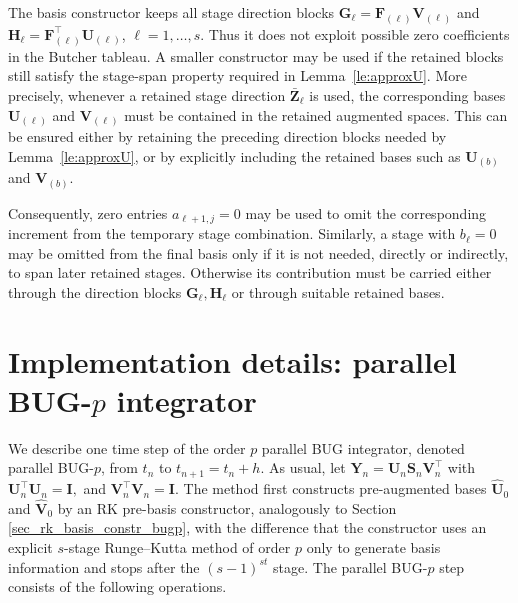 \documentclass[preprint,runningheads]{svjour3}
\newcommand\bfI{{\mathbf I}}
\newcommand\bfF{{\mathbf F}}
\newcommand\bfG{{\mathbf G}}
\newcommand\bfH{{\mathbf H}}
\newcommand\bfS{{\mathbf S}}
\newcommand\bfU{{\mathbf U}}
\newcommand\bfV{{\mathbf V}}
\newcommand\bfY{{\mathbf Y}}
\newcommand\bfZ{{\mathbf Z}}
\begin{document}
\begin{remark}
The basis constructor  keeps all stage direction
blocks $\bfG_\ell=\bfF_{(\ell)}\bfV_{(\ell)}$ and
$\bfH_\ell=\bfF_{(\ell)}^\top\bfU_{(\ell)}$, $\ell=1,\ldots,s$. Thus it does
not exploit possible zero coefficients in the Butcher tableau. A smaller
constructor may be used if the retained blocks still satisfy the stage-span
property required in Lemma~\ref{le:approxU}. More precisely, whenever a retained
stage direction $\bar\bfZ_\ell$ is used, the corresponding bases
$\bfU_{(\ell)}$ and $\bfV_{(\ell)}$ must be contained in the retained augmented
spaces. This can be ensured either by retaining the preceding direction blocks
needed by Lemma~\ref{le:approxU}, or by explicitly including the retained bases
such as $\bfU_{(b)}$ and $\bfV_{(b)}$.

Consequently, zero entries $a_{\ell+1,j}=0$ may be used to omit the
corresponding increment from the temporary stage combination. Similarly, a stage
with $b_\ell=0$ may be omitted from the final basis only if it is not needed,
directly or indirectly, to span later retained stages. Otherwise its contribution
must be carried either through the direction blocks
$\bfG_\ell,\bfH_\ell$ or through suitable retained bases.
\end{remark}


\section{Implementation details: parallel BUG-$p$ integrator}
\label{sec:impl_parallel_bugp}

We describe one time step of the order $p$ parallel BUG integrator, denoted
parallel BUG-$p$, from $t_n$ to $t_{n+1}=t_n+h$. As usual, let
$
    \bfY_n=\bfU_n\bfS_n\bfV_n^\top $ with $
    \bfU_n^\top\bfU_n=\bfI,$ and $
    \bfV_n^\top\bfV_n=\bfI .
$
The method first constructs pre-augmented bases
$\widehat\bfU_0$ and $\widehat\bfV_0$ by an RK pre-basis constructor, analogously to Section \ref{sec_rk_basis_constr_bugp}, with the difference that the
constructor uses an explicit $s$-stage Runge--Kutta method of order $p$ only to
generate basis information and stops after the $(s-1)^{st}$ stage.
The parallel BUG-$p$ step consists of the following operations.
\end{document}

